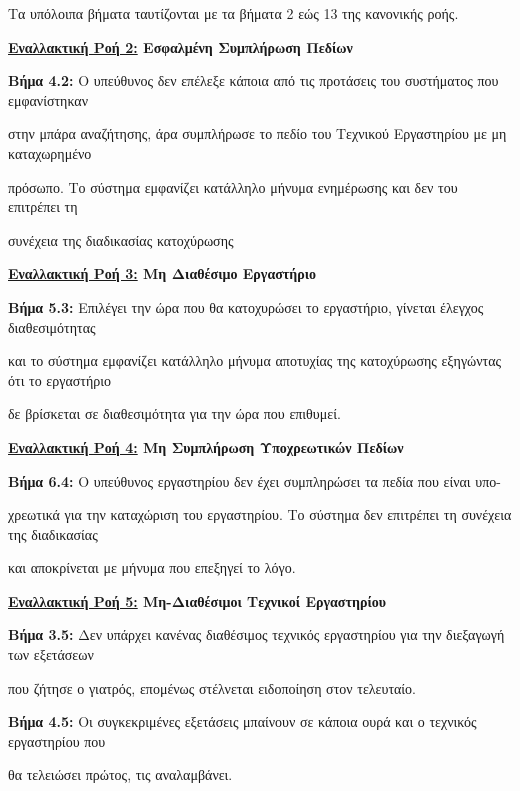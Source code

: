 \documentclass{article}
\begin{document}
Tα υπόλοιπα βήματα ταυτίζονται με τα βήματα 2 εώς 13 της κανονικής ροής. \vspace{0.2cm}

\textbf{\underline{Εναλλακτική Ροή 2:} Εσφαλμένη Συμπλήρωση Πεδίων} \vspace{0.2cm}
\par \textbf{Βήμα 4.2:} Ο υπεύθυνος δεν επέλεξε κάποια από τις προτάσεις του συστήματος που εμφανίστηκαν \par στην μπάρα αναζήτησης, άρα συμπλήρωσε το πεδίο του Τεχνικού Εργαστηρίου με μη καταχωρημένο \par πρόσωπο. Το σύστημα εμφανίζει κατάλληλο μήνυμα ενημέρωσης και δεν του επιτρέπει τη \par συνέχεια της διαδικασίας κατοχύρωσης \vspace{0.2cm}

\textbf{\underline{Εναλλακτική Ροή 3:} Μη Διαθέσιμο Εργαστήριο} \vspace{0.2cm}
\par \textbf{Βήμα 5.3:} Επιλέγει την ώρα που θα κατοχυρώσει το εργαστήριο, γίνεται έλεγχος διαθεσιμότητας \par και το σύστημα εμφανίζει κατάλληλο μήνυμα αποτυχίας της κατοχύρωσης εξηγώντας ότι το εργαστήριο \par δε βρίσκεται σε διαθεσιμότητα για την ώρα που επιθυμεί. \vspace{0.2cm}

\textbf{\underline{Εναλλακτική Ροή 4:} Μη Συμπλήρωση Υποχρεωτικών Πεδίων} \vspace{0.2cm}
\par \textbf{Βήμα 6.4:} Ο υπεύθυνος εργαστηρίου δεν έχει συμπληρώσει τα πεδία που είναι υπο- \par χρεωτικά για την καταχώριση του εργαστηρίου. Το σύστημα δεν επιτρέπει τη συνέχεια της διαδικασίας \par και αποκρίνεται με μήνυμα που επεξηγεί το λόγο.  \vspace{0.2cm}

\textbf{\underline{Εναλλακτική Ροή 5:} Μη-Διαθέσιμοι Τεχνικοί Εργαστηρίου} \vspace{0.2cm}
\par \textbf{Βήμα 3.5:} Δεν υπάρχει κανένας διαθέσιμος τεχνικός εργαστηρίου για την διεξαγωγή των εξετάσεων \par που ζήτησε ο γιατρός, επομένως στέλνεται ειδοποίηση στον τελευταίο. \vspace{0.1cm}
\par \textbf{Βήμα 4.5:} Οι συγκεκριμένες εξετάσεις μπαίνουν σε κάποια ουρά και ο τεχνικός εργαστηρίου που \par θα τελειώσει πρώτος, τις αναλαμβάνει.
\end{document}
